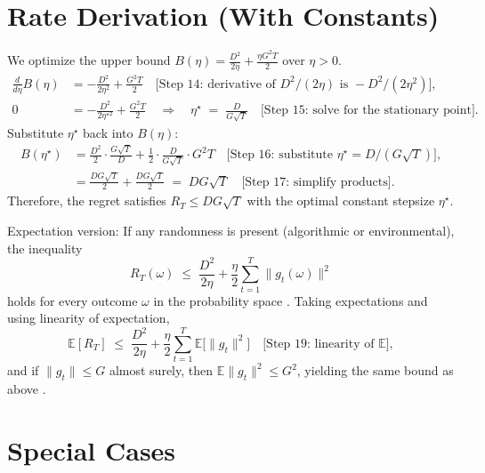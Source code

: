 \documentclass[12pt]{article}
\newcommand{\E}{\mathbb{E}}
\begin{document}
\section*{Rate Derivation (With Constants)}
We optimize the upper bound $B(\eta)=\frac{D^2}{2\eta} + \frac{\eta G^2 T}{2}$ over $\eta>0$.
\begin{align*}
\frac{d}{d\eta} B(\eta) 
&= -\frac{D^2}{2\eta^2} + \frac{G^2 T}{2} \quad \text{[Step 14: derivative of }D^2/(2\eta)\text{ is }-D^2/(2\eta^2)],\\
0 &= -\frac{D^2}{2\eta^{\star 2}} + \frac{G^2 T}{2} 
\quad \Rightarrow \quad 
\eta^\star \;=\; \frac{D}{G\sqrt{T}}
\quad \text{[Step 15: solve for the stationary point]}.
\end{align*}
Substitute $\eta^\star$ back into $B(\eta)$:
\begin{align*}
B(\eta^\star) 
&= \frac{D^2}{2}\cdot \frac{G\sqrt{T}}{D} + \frac{1}{2}\cdot \frac{D}{G\sqrt{T}} \cdot G^2 T
\quad \text{[Step 16: substitute }\eta^\star=D/(G\sqrt{T})],\\
&= \frac{DG\sqrt{T}}{2} + \frac{DG\sqrt{T}}{2} 
\;=\; DG\sqrt{T}
\quad \text{[Step 17: simplify products]}.
\end{align*}
Therefore, the regret satisfies $R_T \le DG\sqrt{T}$ with the optimal constant stepsize $\eta^\star$.

Expectation version: If any randomness is present (algorithmic or environmental), the inequality
\[
R_T(\omega) \;\le\; \frac{D^2}{2\eta} + \frac{\eta}{2}\sum_{t=1}^T \|g_t(\omega)\|^2
\]
holds for every outcome $\omega$ in the probability space
\quad {}.
Taking expectations and using linearity of expectation,
\[
\E[R_T] \;\le\; \frac{D^2}{2\eta} + \frac{\eta}{2}\sum_{t=1}^T \E\bigl[\|g_t\|^2\bigr] 
\quad \text{[Step 19: linearity of }\E\text{]},
\]
and if $\|g_t\|\le G$ almost surely, then $\E\|g_t\|^2 \le G^2$, yielding the same bound as above
\quad {}.

\section*{Special Cases}
\end{document}
